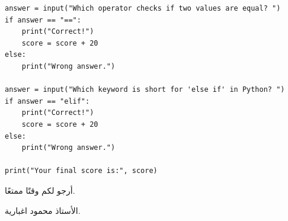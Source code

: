 \documentclass[14pt]{extarticle}
\begin{document}
\begin{enumerate}[resume, label=\textbf{تمرين \arabic*:}, wide=0pt, itemsep=2.2em]
\begin{boxSolution}
\begin{english}
\begin{verbatim}
answer = input("Which operator checks if two values are equal? ")
if answer == "==":
    print("Correct!")
    score = score + 20
else:
    print("Wrong answer.")

answer = input("Which keyword is short for 'else if' in Python? ")
if answer == "elif":
    print("Correct!")
    score = score + 20
else:
    print("Wrong answer.")

print("Your final score is:", score)
\end{verbatim}
\end{english}
\end{boxSolution}
\fi

\end{enumerate}

\vspace{1cm}
\begin{flushleft}
أرجو لكم وقتًا ممتعًا.

الأستاذ محمود اغبارية.
\end{flushleft}
\end{document}
